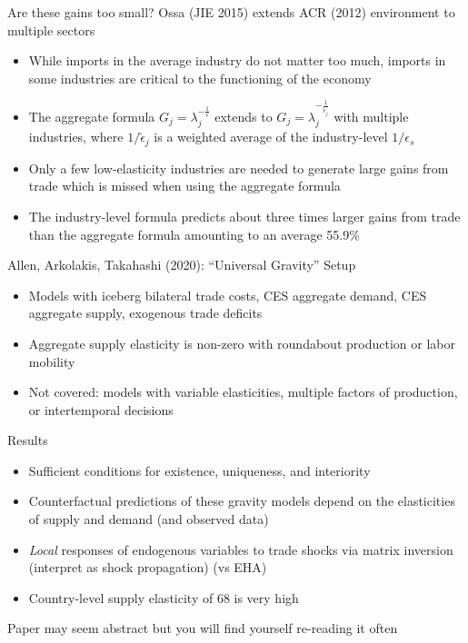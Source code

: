 \documentclass[10pt,notes=hide]{beamer}
\begin{document}
\begin{frame}{Are these gains too small?}
Ossa (JIE 2015) extends ACR (2012) environment to multiple sectors
\begin{itemize}
\item While imports in the average industry do not matter too much, imports
in some industries are critical to the functioning of the economy
\item The aggregate formula $G_{j}=\lambda _{j}^{-\frac{1}{\epsilon }}$
extends to $G_{j}=\lambda _{j}^{-\frac{1}{\tilde{\epsilon}_{j}}}$ with
multiple industries, where $1/\tilde{\epsilon}_{j}$ is a weighted average
of the industry-level $1/\epsilon _{s}$
\item Only a few low-elasticity industries are needed to generate large
gains from trade which is missed when using the aggregate formula
\item The industry-level formula predicts about three times larger gains
from trade than the aggregate formula amounting to an average 55.9\%
\end{itemize}
\end{frame}
\begin{frame}{Allen, Arkolakis, Takahashi (2020): ``Universal Gravity''}
Setup
\begin{itemize}
\item Models with iceberg bilateral trade costs, CES aggregate demand, CES aggregate supply, exogenous trade deficits
\item Aggregate supply elasticity is non-zero with roundabout production or labor mobility
\item Not covered: models with variable elasticities, multiple factors of production, or intertemporal decisions
\end{itemize}
Results
\begin{itemize}
\item Sufficient conditions for existence, uniqueness, and interiority
\item Counterfactual predictions of these gravity models depend on the elasticities of supply and demand (and observed data)
\item \textit{Local} responses of endogenous variables to trade shocks via matrix inversion
(interpret as shock propagation)
(vs EHA)
\item Country-level supply elasticity of 68 is very high
\end{itemize}
Paper may seem abstract but you will find yourself re-reading it often
\end{frame}
\end{document}
